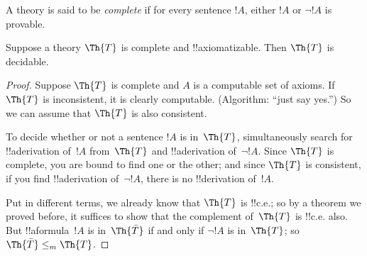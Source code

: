 \documentclass[../../../include/open-logic-section]{subfiles}
\begin{document}


A theory is said to be {\em complete} if for every sentence $!A$,
either $!A$ or $\lnot !A$ is provable.

\begin{lem}
Suppose a theory $\Th{T}$ is complete and !!{axiomatizable}. Then
$\Th{T}$ is decidable.
\end{lem}

\begin{proof}
Suppose $\Th{T}$ is complete and $A$ is a computable set of axioms.
If $\Th{T}$ is inconsistent, it is clearly computable. (Algorithm: ``just
say yes.'') So we can assume that $\Th{T}$ is also consistent.

To decide whether or not a sentence $!A$ is in~$\Th{T}$,
simultaneously search for !!a{derivation} of~$!A$ from~$\Th{T}$ and
!!a{derivation} of~$\lnot !A$. Since $\Th{T}$ is complete, you are
bound to find one or the other; and since $\Th{T}$ is consistent, if you
find !!a{derivation} of~$\lnot !A$, there is no !!{derivation} of~$!A$.

Put in different terms, we already know that $\Th{T}$ is !!{c.e.}; so
by a theorem we proved before, it suffices to show that the complement
of~$\Th{T}$ is !!{c.e.} also. But !!a{formula}~$!A$ is in~$\Th{\bar
T}$ if and only if $\lnot !A$ is in~$\Th{T}$; so $\Th{\bar T} \leq_m
\Th{T}$.
\end{proof}
\end{document}
